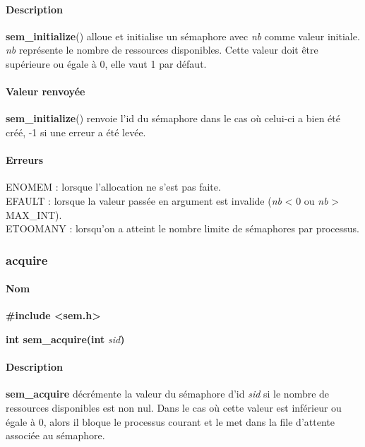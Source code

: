 \documentclass[12pt]{article}
\begin{document}
          \paragraph{Description\\}
          \textbf{sem\_initialize}() alloue et initialise un sémaphore avec \textit{nb} comme valeur initiale. \\ \textit{nb} représente le nombre de ressources disponibles. Cette valeur doit être supérieure ou égale à 0, elle vaut 1 par défaut.

          \paragraph{Valeur renvoyée\\}
          \textbf{sem\_initialize}() renvoie l'id du sémaphore dans le cas où celui-ci a bien été créé, -1 si une erreur a été levée.
          \paragraph{Erreurs\\}
          ENOMEM : lorsque l'allocation ne s'est pas faite. \\
          EFAULT : lorsque la valeur passée en argument est invalide (\textit{nb} < 0 ou \textit{nb} > MAX\_INT). \\
          ETOOMANY : lorsqu'on a atteint le nombre limite de sémaphores par processus. \\
      \newpage
      \subsubsection{acquire}
          \paragraph{Nom\\}
          \textbf{\#include <sem.h>}

          \textbf{int sem\_acquire(int }\textit{sid}\textbf{)}
          \paragraph{Description\\}
          \textbf{sem\_acquire} décrémente la valeur du sémaphore d'id \textit{sid} si le nombre de ressources disponibles est non nul. Dans le cas où cette valeur est inférieur ou égale à 0, alors il bloque le processus courant et le met dans la file d'attente associée au sémaphore.
\end{document}
